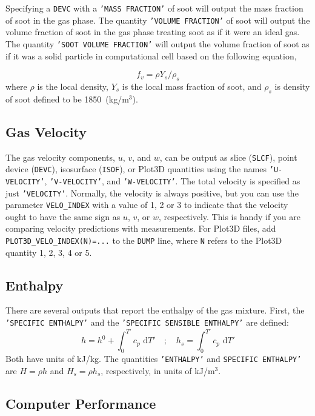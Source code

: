 \documentclass[11pt]{book}
\newcommand{\ct}{\tt\small}
\renewcommand{\d}{\,\mathrm{d}}
\newcommand{\be}{\begin{equation}}
\newcommand{\ee}{\end{equation}}
\begin{document}
\noindent Specifying a {\ct DEVC} with a {\ct 'MASS FRACTION'} of soot will output the mass fraction of soot in the gas phase. The quantity {\ct 'VOLUME FRACTION'} of soot will output the volume fraction of soot in the gas phase treating soot as if it were an ideal gas. The quantity {\ct 'SOOT VOLUME FRACTION'} will output the volume fraction of soot as if it was a solid particle in computational cell based on the following equation,

\begin{equation}\label{eq:soot_volume_fraction}
f_v = \rho Y_{s} / \rho_{s}
\end{equation}
\noindent where $\rho$ is the local density, $Y_{s}$ is the local mass fraction of soot, and $\rho_{s}$ is density of soot defined to be 1850~(kg/m$^3$).

\subsection{Gas Velocity}
\label{info:velocity}

The gas velocity components, $u$, $v$, and $w$, can be output as slice ({\ct SLCF}), point device ({\ct DEVC}), isosurface ({\ct ISOF}), or Plot3D quantities using
the names {\ct 'U-VELOCITY'}, {\ct 'V-VELOCITY'}, and {\ct 'W-VELOCITY'}.
The total velocity is specified as just {\ct 'VELOCITY'}. Normally, the velocity is always positive, but you can use the parameter {\ct VELO\_INDEX} with a value
of 1, 2 or 3 to indicate that the velocity ought to have the same sign as $u$, $v$, or $w$, respectively. This is handy if you are comparing velocity predictions
with measurements. For Plot3D files, add {\ct PLOT3D\_VELO\_INDEX(N)=...} to the {\ct DUMP} line, where {\ct N} refers to the Plot3D quantity 1, 2, 3, 4 or 5.


\subsection{Enthalpy}
\label{info:enthalpy}

There are several outputs that report the enthalpy of the gas mixture. First, the {\ct 'SPECIFIC ENTHALPY'} and the {\ct 'SPECIFIC SENSIBLE ENTHALPY'} are defined:
\be
   h = h^0 + \int_0^{T'} c_p \, \d T'  \quad ; \quad h_s = \int_0^{T'} c_p \, \d T'
\ee
Both have units of kJ/kg.
The quantities {\ct 'ENTHALPY'} and {\ct SPECIFIC ENTHALPY'} are $H=\rho h$ and $H_s=\rho h_s$, respectively, in units of kJ/m$^3$.


\subsection{Computer Performance}
\label{info:TIMING}
\end{document}

